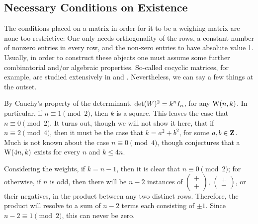 \documentclass[../../../main]{subfiles}
\begin{document}
 \dinkus
 
 \subsection{Necessary Conditions on Existence}
 
 The conditions placed on a matrix in order for it to be a weighing matrix are none too restrictive: One only needs orthogonality of the rows, a constant number of nonzero entries in every row, and the non-zero entries to have absolute value 1. Usually, in order to construct these objects one must assume some further combinatorial and/or algebraic properties. So-called cocyclic matrices, for example, are studied extensively in \cite{horadam-hadamard-matrices} and \cite{algebraic-design-theory}. Nevertheless, we can say a few things at the outset.
 
 By Cauchy's property of the determinant, $\text{det}(W)^2 = k^nI_n$, for any $\text{W}(n,k)$. In particular, if $n \equiv 1 \pmod{2}$, then $k$ is a square. This leaves the case that $n \equiv 0 \pmod{2}$. It turns out, though we will not show it here, that if $n \equiv 2 \pmod{4}$, then it must be the case that $k = a^2 + b^2$, for some $a,b \in \mathbf{Z}$. Much is not known about the case $n \equiv 0 \pmod{4}$, though \cite{seberry-od-2017} conjectures that a $\text{W}(4n,k)$ exists for every $n$ and $k \leq 4n$.
 
 Considering the weights, if $k = n-1$, then it is clear that $n \equiv 0 \pmod{2}$; for otherwise, if $n$ is odd, then there will be $n-2$ instances of $\left(\begin{smallmatrix}+\\+\end{smallmatrix}\right)$, $\left(\begin{smallmatrix}+\\-\end{smallmatrix}\right)$, or their negatives, in the product between any two distinct rows. Therefore, the product will resolve to a sum of $n-2$ terms each consisting of $\pm 1$. Since $n-2 \equiv 1 \pmod{2}$, this can never be zero.
 
\end{document}
